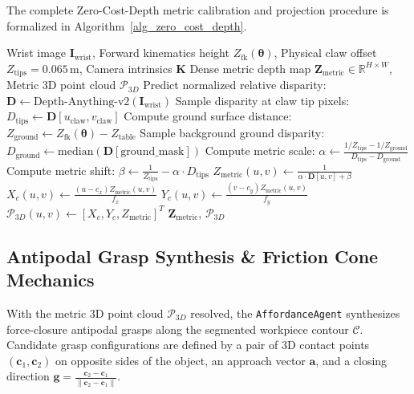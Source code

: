 \documentclass[journal]{IEEEtran}
\begin{document}
The complete Zero-Cost-Depth metric calibration and projection procedure is formalized in Algorithm~\ref{alg_zero_cost_depth}.

\begin{algorithm}[!t]
\caption{Zero-Cost-Depth Metric Calibration and 3D Projection}
\label{alg_zero_cost_depth}
\begin{algorithmic}[1]
\REQUIRE Wrist image $\mathbf{I}_{\text{wrist}}$, Forward kinematics height $Z_{\text{fk}}(\boldsymbol{\theta})$, Physical claw offset $Z_{\text{tips}} = 0.065$\,m, Camera intrinsics $\mathbf{K}$
\ENSURE Dense metric depth map $\mathbf{Z}_{\text{metric}} \in \mathbb{R}^{H \times W}$, Metric 3D point cloud $\mathcal{P}_{3D}$
\STATE Predict normalized relative disparity: $\mathbf{D} \leftarrow \text{Depth-Anything-v2}(\mathbf{I}_{\text{wrist}})$
\STATE Sample disparity at claw tip pixels: $D_{\text{tips}} \leftarrow \mathbf{D}[u_{\text{claw}}, v_{\text{claw}}]$
\STATE Compute ground surface distance: $Z_{\text{ground}} \leftarrow Z_{\text{fk}}(\boldsymbol{\theta}) - Z_{\text{table}}$
\STATE Sample background ground disparity: $D_{\text{ground}} \leftarrow \text{median}(\mathbf{D}[\text{ground\_mask}])$
\STATE Compute metric scale: $\alpha \leftarrow \frac{1/Z_{\text{tips}} - 1/Z_{\text{ground}}}{D_{\text{tips}} - D_{\text{ground}}}$
\STATE Compute metric shift: $\beta \leftarrow \frac{1}{Z_{\text{tips}}} - \alpha \cdot D_{\text{tips}}$
    \STATE $Z_{\text{metric}}(u, v) \leftarrow \frac{1}{\alpha \cdot \mathbf{D}[u, v] + \beta}$
    \STATE $X_c(u, v) \leftarrow \frac{(u - c_x) Z_{\text{metric}}(u, v)}{f_x}$
    \STATE $Y_c(u, v) \leftarrow \frac{(v - c_y) Z_{\text{metric}}(u, v)}{f_y}$
    \STATE $\mathcal{P}_{3D}(u, v) \leftarrow [X_c, Y_c, Z_{\text{metric}}]^T$
\ENDFOR
\RETURN $\mathbf{Z}_{\text{metric}}$, $\mathcal{P}_{3D}$
\end{algorithmic}
\end{algorithm}

\subsection{Antipodal Grasp Synthesis \& Friction Cone Mechanics}
With the metric 3D point cloud $\mathcal{P}_{3D}$ resolved, the \texttt{AffordanceAgent} synthesizes force-closure antipodal grasps along the segmented workpiece contour $\mathcal{C}$. Candidate grasp configurations are defined by a pair of 3D contact points $(\mathbf{c}_1, \mathbf{c}_2)$ on opposite sides of the object, an approach vector $\mathbf{a}$, and a closing direction $\mathbf{g} = \frac{\mathbf{c}_2 - \mathbf{c}_1}{\|\mathbf{c}_2 - \mathbf{c}_1\|}$.
\end{document}
